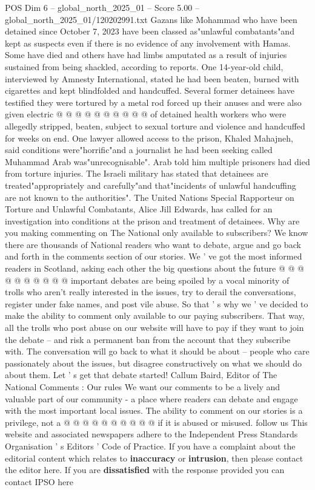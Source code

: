 \begin{textsample}{POS Dim 6 – global\_north\_2025\_01 – Score 5.00 – global\_north\_2025\_01/120202991.txt}
Gazans like Mohammad who have been detained since October 7, 2023 have been classed as"unlawful combatants"and kept as suspects even if there is no evidence of any involvement with Hamas.
Some have died and others have had limbs amputated as a result of injuries sustained from being shackled, according to reports.
One 14-year-old child, interviewed by Amnesty International, stated he had been beaten, burned with cigarettes and kept blindfolded and handcuffed.
Several former detainees have testified they were tortured by a metal rod forced up their anuses and were also given electric @ @ @ @ @ @ @ @ @ @ of detained health workers who were allegedly stripped, beaten, subject to sexual torture and violence and handcuffed for weeks on end.
One lawyer allowed access to the prison, Khaled Mahajneh, said conditions were"horrific"and a journalist he had been seeking called Muhammad Arab was"unrecognisable".
Arab told him multiple prisoners had died from torture injuries.
The Israeli military has stated that detainees are treated"appropriately and carefully"and that"incidents of unlawful handcuffing are not known to the authorities".
The United Nations Special Rapporteur on Torture and Unlawful Combatants, Alice Jill Edwards, has called for an investigation into conditions at the prison and treatment of detainees.
Why are you making commenting on The National only available to subscribers?
We know there are thousands of National readers who want to debate, argue and go back and forth in the comments section of our stories.
We ' ve got the most informed readers in Scotland, asking each other the big questions about the future @ @ @ @ @ @ @ @ @ @ important debates are being spoiled by a vocal minority of trolls who aren't really interested in the issues, try to derail the conversations, register under fake names, and post vile abuse.
So that ' s why we ' ve decided to make the ability to comment only available to our paying subscribers.
That way, all the trolls who post abuse on our website will have to pay if they want to join the debate -- and risk a permanent ban from the account that they subscribe with.
The conversation will go back to what it should be about -- people who care passionately about the issues, but disagree constructively on what we should do about them.
Let ' s get that debate started!
Callum Baird, Editor of The National Comments : Our rules We want our comments to be a lively and valuable part of our community - a place where readers can debate and engage with the most important local issues.
The ability to comment on our stories is a privilege, not a @ @ @ @ @ @ @ @ @ @ if it is abused or misused. follow us This website and associated newspapers adhere to the Independent Press Standards Organisation ' s Editors ' Code of Practice.
If you have a complaint about the editorial content which relates to \textbf{inaccuracy} or \textbf{intrusion}, then please contact the editor here.
If you are \textbf{dissatisfied} with the response provided you can contact IPSO here

\end{textsample}
